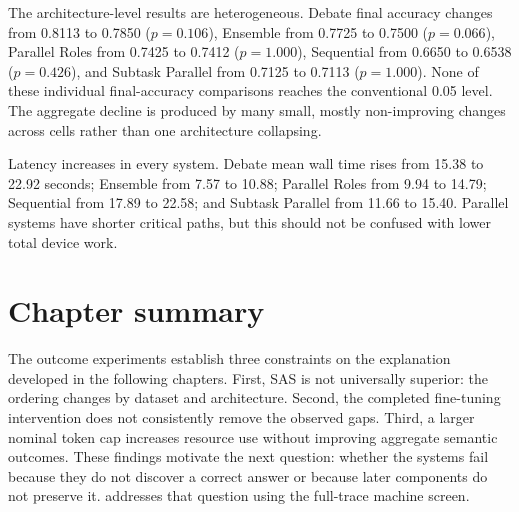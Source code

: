 The architecture-level results are heterogeneous. Debate final accuracy changes from 0.8113 to 0.7850 ($p=0.106$), Ensemble from 0.7725 to 0.7500 ($p=0.066$), Parallel Roles from 0.7425 to 0.7412 ($p=1.000$), Sequential from 0.6650 to 0.6538 ($p=0.426$), and Subtask Parallel from 0.7125 to 0.7113 ($p=1.000$). None of these individual final-accuracy comparisons reaches the conventional 0.05 level. The aggregate decline is produced by many small, mostly non-improving changes across cells rather than one architecture collapsing.

Latency increases in every system. Debate mean wall time rises from 15.38 to 22.92 seconds; Ensemble from 7.57 to 10.88; Parallel Roles from 9.94 to 14.79; Sequential from 17.89 to 22.58; and Subtask Parallel from 11.66 to 15.40. Parallel systems have shorter critical paths, but this should not be confused with lower total device work.

\section{Chapter summary}

The outcome experiments establish three constraints on the explanation developed in the following chapters. First, SAS is not universally superior: the ordering changes by dataset and architecture. Second, the completed fine-tuning intervention does not consistently remove the observed gaps. Third, a larger nominal token cap increases resource use without improving aggregate semantic outcomes. These findings motivate the next question: whether the systems fail because they do not discover a correct answer or because later components do not preserve it.  addresses that question using the full-trace machine screen.
